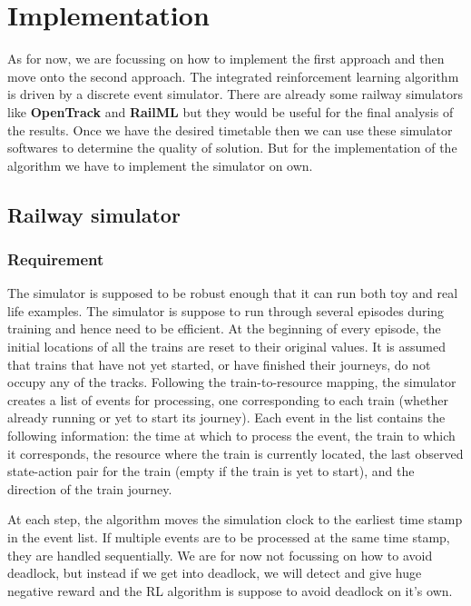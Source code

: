 \chapter{Implementation}

As for now, we are focussing on how to implement the first approach 
and then move onto the second approach. The integrated reinforcement learning algorithm is driven
by a discrete event simulator. There are already some railway simulators like \textbf{OpenTrack} \cite{WEBSITE:2} and \textbf{RailML}\cite{WEBSITE:3} but they
would be useful for the final analysis of the results. Once we have the desired timetable then we can use these 
simulator softwares to determine the quality of solution. But for the implementation of the 
algorithm we have to implement the simulator on own.

\section {Railway simulator}
\subsection{Requirement}
The simulator is supposed to be robust enough that it can run both toy and real life 
examples. 
The simulator is suppose to run through several episodes during training and hence need 
to be efficient. At the
beginning of every episode, the initial locations of all the trains
are reset to their original values. It is assumed that trains that have not yet started, 
or have finished their journeys, do not
occupy any of the tracks. Following the train-to-resource mapping, 
the simulator creates a list of events for processing, one
corresponding to each train (whether already running or yet to
start its journey). Each event in the list contains the following
information: the time at which to process the event, the train to
which it corresponds, the resource where the train is currently
located, the last observed state-action pair for the train (empty
if the train is yet to start), and the direction of the train journey. 

At each step, the algorithm moves the simulation clock to
the earliest time stamp in the event list. If multiple events are to
be processed at the same time stamp, they are handled sequentially. We are for now 
not focussing on how to avoid deadlock, but instead if we get into deadlock, we will detect and give huge
negative reward and the RL algorithm is suppose to avoid deadlock on it's own.


